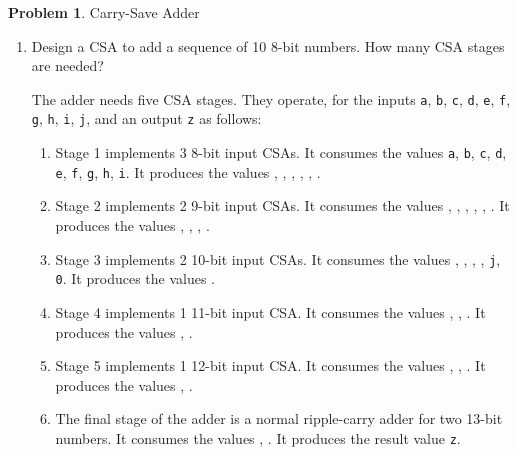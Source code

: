 \documentclass[10pt]{article}
\theoremstyle{definition}
\newtheorem{problem}{Problem}
\begin{document}
  \begin{problem}
    Carry-Save Adder

    \begin{enumerate}
      \item Design a CSA to add a sequence of 10 8-bit numbers. How many CSA stages are needed?

      The adder needs five CSA stages. They operate, for the inputs \texttt{a}, \texttt{b}, \texttt{c}, \texttt{d}, \texttt{e}, \texttt{f}, \texttt{g}, \texttt{h}, \texttt{i}, \texttt{j}, and an output \texttt{z} as follows:
      \begin{enumerate}
        \item Stage 1 implements 3 8-bit input CSAs. It consumes the values \texttt{a}, \texttt{b}, \texttt{c}, \texttt{d}, \texttt{e}, \texttt{f}, \texttt{g}, \texttt{h}, \texttt{i}. It produces the values \texttt{}, \texttt{}, \texttt{}, \texttt{}, \texttt{}, \texttt{}.
        \item Stage 2 implements 2 9-bit input CSAs. It consumes the values \texttt{}, \texttt{}, \texttt{}, \texttt{}, \texttt{}, \texttt{}. It produces the values \texttt{}, \texttt{}, \texttt{}, \texttt{}.
        \item Stage 3 implements 2 10-bit input CSAs. It consumes the values \texttt{}, \texttt{}, \texttt{}, \texttt{}, \texttt{j}, \texttt{0}. It produces the values .
        \item Stage 4 implements 1 11-bit input CSA. It consumes the values \texttt{}, \texttt{}, \texttt{}. It produces the values \texttt{}, \texttt{}.
        \item Stage 5 implements 1 12-bit input CSA. It consumes the values \texttt{}, \texttt{}, \texttt{}. It produces the values \texttt{}, \texttt{}.
        \item The final stage of the adder is a normal ripple-carry adder for two 13-bit numbers. It consumes the values \texttt{}, \texttt{}. It produces the result value \texttt{z}.
      \end{enumerate}


\end{enumerate}
\end{problem}
\end{document}
